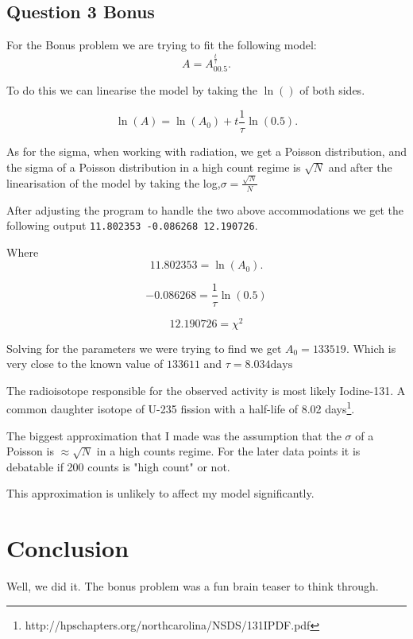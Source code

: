 \documentclass{article}
\begin{document}
\subsection{Question 3 Bonus}
For the Bonus problem we are trying to fit the following model:
\[
	A = A_00.5^\frac{t}{\tau}
.\] 

To do this we can linearise the model by taking the $\ln()$ of both sides.

\[
	\ln(A) = \ln(A_0) + t\frac{1}{\tau}\ln(0.5)
.\] 

As for the sigma, when working with radiation, we get a Poisson distribution, and the sigma of a Poisson distribution in a high count regime is $ \sqrt{N} $ and after the linearisation of the model by taking the log,$ \sigma = \frac{\sqrt{N}}{N}  $

After adjusting the program to handle the two above accommodations we get the following output \texttt{11.802353	-0.086268	12.190726}.

Where 
\[11.802353 = \ln(A_0).\]

\[-0.086268=\frac{1}{\tau}\ln(0.5)\]

\[12.190726 = \chi^2\]

Solving for the parameters we were trying to find we get $A_0 = 133519$. Which is very close to the known value of $133611$ and $\tau= 8.034 \text{days}$

The radioisotope responsible for the observed activity is most likely Iodine-131. A common daughter isotope of U-235 fission with a half-life of 8.02 days\footnote{http://hpschapters.org/northcarolina/NSDS/131IPDF.pdf}.

The biggest approximation that I made was the assumption that the $\sigma$ of a Poisson is $\approx \sqrt{N}$ in a high counts regime. For the later data points it is debatable if 200 counts is "high count" or not. 

This approximation is unlikely to affect my model significantly.

\section{Conclusion}

Well, we did it. The bonus problem was a fun brain teaser to think through.
\end{document}
